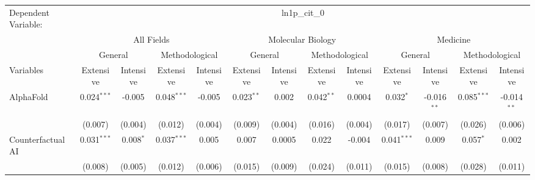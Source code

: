 \begingroup
\centering
\begin{tabular}{lcccccccccccc}
   \tabularnewline \midrule \midrule
   Dependent Variable: & \multicolumn{12}{c}{ln1p\_cit\_0}\\
 & \multicolumn{4}{c}{All Fields} & \multicolumn{4}{c}{Molecular Biology} & \multicolumn{4}{c}{Medicine} \\
\cmidrule(lr){2-5} \cmidrule(lr){6-9} \cmidrule(lr){10-13}
 & \multicolumn{2}{c}{General} & \multicolumn{2}{c}{Methodological} & \multicolumn{2}{c}{General} & \multicolumn{2}{c}{Methodological} & \multicolumn{2}{c}{General} & \multicolumn{2}{c}{Methodological} \\
\cmidrule(lr){2-3} \cmidrule(lr){4-5} \cmidrule(lr){6-7} \cmidrule(lr){8-9} \cmidrule(lr){10-11} \cmidrule(lr){12-13}
Variables & \multicolumn{1}{c}{Extensive} & \multicolumn{1}{c}{Intensive} & \multicolumn{1}{c}{Extensive} & \multicolumn{1}{c}{Intensive} & \multicolumn{1}{c}{Extensive} & \multicolumn{1}{c}{Intensive} & \multicolumn{1}{c}{Extensive} & \multicolumn{1}{c}{Intensive} & \multicolumn{1}{c}{Extensive} & \multicolumn{1}{c}{Intensive} & \multicolumn{1}{c}{Extensive} & \multicolumn{1}{c}{Intensive} \\
\cmidrule(lr){1-1}\cmidrule(lr){2-2} \cmidrule(lr){3-3} \cmidrule(lr){4-4} \cmidrule(lr){5-5} \cmidrule(lr){6-6} \cmidrule(lr){7-7} \cmidrule(lr){8-8} \cmidrule(lr){9-9} \cmidrule(lr){10-10} \cmidrule(lr){11-11} \cmidrule(lr){12-12} \cmidrule(lr){13-13}
   AlphaFold                                & 0.024$^{***}$ & -0.005        & 0.048$^{***}$ & -0.005        & 0.023$^{**}$ & 0.002           & 0.042$^{**}$ & 0.0004          & 0.032$^{*}$   & -0.016$^{**}$ & 0.085$^{***}$ & -0.014$^{**}$\\   
                                            & (0.007)       & (0.004)       & (0.012)       & (0.004)       & (0.009)      & (0.004)         & (0.016)      & (0.004)         & (0.017)       & (0.007)       & (0.026)       & (0.006)\\   
   Counterfactual AI                        & 0.031$^{***}$ & 0.008$^{*}$   & 0.037$^{***}$ & 0.005         & 0.007        & 0.0005          & 0.022        & -0.004          & 0.041$^{***}$ & 0.009         & 0.057$^{*}$   & 0.002\\   
                                            & (0.008)       & (0.005)       & (0.012)       & (0.006)       & (0.015)      & (0.009)         & (0.024)      & (0.011)         & (0.015)       & (0.008)       & (0.028)       & (0.011)\\   

\end{tabular}

